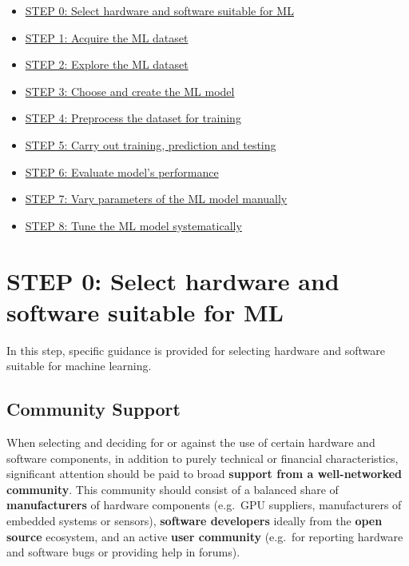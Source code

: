 \documentclass [oneside,10pt,a4paper,ngerman,BCOR10mm,headsepline,parindent,final]{scrartcl}
\providecommand{\tightlist}{%
      \setlength{\itemsep}{0pt}\setlength{\parskip}{0pt}}
\begin{document}
\begin{itemize}
\tightlist
\item
  \hyperref[step-0-select-hardware-and-software-suitable-for-ml]{STEP 0: Select hardware and software suitable for ML}
\item
  \hyperref[step-1-acquire-the-ml-dataset]{STEP 1: Acquire the ML dataset}
\item
  \hyperref[step-2-explore-the-ml-dataset]{STEP 2: Explore the ML dataset}
\item
  \hyperref[step-3-choose-and-create-the-ml-model]{STEP 3: Choose and create the ML model}
\item
  \hyperref[step-4-preprocess-the-dataset-for-training]{STEP 4: Preprocess the dataset for training}
\item
  \hyperref[step-5-carry-out-training-prediction-and-testing]{STEP 5: Carry out training, prediction and testing}
\item
  \hyperref[step-6-evaluate-models-performance]{STEP 6: Evaluate model’s performance}
\item
  \hyperref[step-7-vary-parameters-of-the-ml-model-manually]{STEP 7: Vary parameters of the ML model manually}
\item
  \hyperref[step-8-tune-the-ml-model-systematically]{STEP 8: Tune the ML model systematically}
\end{itemize}

    \hypertarget{step-0-select-hardware-and-software-suitable-for-ml}{%
\section{STEP 0: Select hardware and software suitable for
ML}\label{step-0-select-hardware-and-software-suitable-for-ml}}

In this step, specific guidance is provided for selecting hardware and
software suitable for machine learning.

    \hypertarget{community-support}{%
\subsection{Community Support}\label{community-support}}

When selecting and deciding for or against the use of certain hardware
and software components, in addition to purely technical or financial
characteristics, significant attention should be paid to broad
\textbf{support from a well-networked community}. This community should
consist of a balanced share of \textbf{manufacturers} of hardware
components (e.g.~GPU suppliers, manufacturers of embedded systems or
sensors), \textbf{software developers} ideally from the \textbf{open
source} ecosystem, and an active \textbf{user community} (e.g.~for
reporting hardware and software bugs or providing help in forums).
\end{document}
